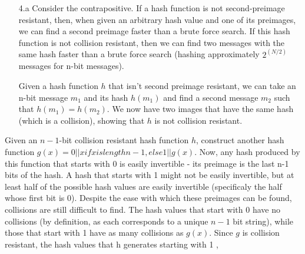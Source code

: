 

\begin{enumerate}
\item[4.a] Consider the contrapositive. If a hash function is not second-preimage resistant, then, when given an arbitrary hash value and one of its preimages, we can find a second preimage faster than a brute force search. If this hash function is not collision resistant, then we can find two messages with the same hash faster than a brute force search (hashing approximately $2^(N/2)$ messages for n-bit messages).

Given a hash function $h$ that isn't second preimage resistant, we can take an n-bit message $m_1$ and its hash $h(m_1)$ and find a second message $m_2$ such that $h(m_1) = h(m_2)$. We now have two images that have the same hash (which is a collision), showing that $h$ is not collision resistant.
\end{enumerate}

Given an $n-1$-bit collision resistant hash function $h$, construct another hash function $g(x) = {0||x if x is length n-1, else 1||g(x)}$. Now, any hash produced by this function that starts with 0 is easily invertible - its preimage is the last n-1 bits of the hash. A hash that starts with 1 might not be easily invertible, but at least half of the possible hash values are easily invertible (specificaly the half whose first bit is 0). Despite the ease with which these preimages can be found, collisions are still difficult to find. The hash values that start with 0 have no collisions (by definition, as each corresponds to a unique $n-1$ bit string), while those that start with 1 have as many collisions as $g(x)$. Since $g$ is collision resistant, the hash values that h generates starting with 1 ,

